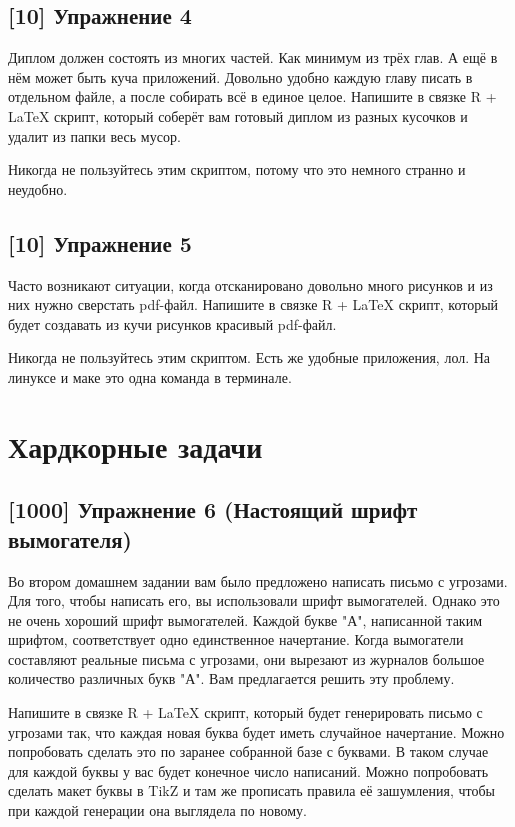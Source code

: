 \documentclass[12pt, a4paper, oneside]{article}
\begin{document}
\subsection*{[10]  Упражнение 4}

Диплом должен состоять из многих частей. Как минимум из трёх глав. А ещё в нём может быть куча приложений. Довольно удобно каждую главу писать в отдельном файле, а после собирать всё в единое целое. Напишите в связке R + \LaTeX{} скрипт, который соберёт вам готовый диплом из разных кусочков и удалит из папки весь мусор.

Никогда не пользуйтесь этим скриптом, потому что это немного странно и неудобно.


\subsection*{[10] Упражнение 5}

Часто возникают ситуации, когда отсканировано довольно много рисунков и из них нужно сверстать pdf-файл. Напишите в связке R + \LaTeX{} скрипт, который будет создавать из кучи рисунков красивый pdf-файл.

Никогда не пользуйтесь этим скриптом. Есть же удобные приложения, лол. На линуксе и маке это одна команда в терминале.

\section*{Хардкорные задачи}

\subsection*{[1000] Упражнение 6 (Настоящий шрифт вымогателя)}

Во втором домашнем задании вам было предложено написать письмо с угрозами. Для того, чтобы написать его, вы использовали шрифт вымогателей. Однако это не очень хороший шрифт вымогателей. Каждой букве "А", написанной таким шрифтом, соответствует одно единственное начертание. Когда вымогатели составляют реальные письма с угрозами, они вырезают из журналов большое количество различных букв "А". Вам предлагается решить эту проблему.

Напишите в связке R + \LaTeX{} скрипт, который будет генерировать письмо с угрозами так, что каждая новая буква будет иметь случайное начертание. Можно попробовать сделать это по заранее собранной базе с буквами. В таком случае для каждой буквы у вас будет конечное число написаний. Можно попробовать сделать макет буквы в TikZ и там же прописать правила её зашумления, чтобы при каждой генерации она выглядела по новому.
\end{document}
